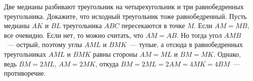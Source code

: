 \problem{}
Две медианы разбивают треугольник на четырехугольник и три равнобедренных
треугольника.
Докажите, что исходный треугольник тоже равнобедренный.
\solution
Пусть медианы $AK$ и $BL$ треугольника $ABC$ пересекаются в точке $M$.
Если $AM = MB$, все очевидно.
Если нет, то можно считать, что $AM = AB$.
Но тогда угол $AMB$~--- острый, поэтому углы $AML$ и $BMK$~--- тупые,
а отсюда в равнобедренных треугольниках $AML$ и $BMK$ равны стороны
$AM = ML$ и $BM = MK$.
Однако, ведь $BM = 2 ML$, $AM = 2 MK$, откуда
$BM = 2 ML = 2 AM = 4 MK = 4 BM$~--- противоречие.
\endproblem
